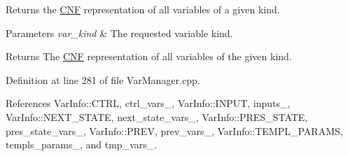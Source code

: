 Returns the \hyperlink{classCNF}{C\-N\-F} representation of all variables of a given kind. 


\begin{DoxyParams}{Parameters}
{\em var\-\_\-kind} & The requested variable kind. \\
\hline
\end{DoxyParams}
\begin{DoxyReturn}{Returns}
The \hyperlink{classCNF}{C\-N\-F} representation of all variables of the given kind. 
\end{DoxyReturn}


Definition at line 281 of file Var\-Manager.\-cpp.



References Var\-Info\-::\-C\-T\-R\-L, ctrl\-\_\-vars\-\_\-, Var\-Info\-::\-I\-N\-P\-U\-T, inputs\-\_\-, Var\-Info\-::\-N\-E\-X\-T\-\_\-\-S\-T\-A\-T\-E, next\-\_\-state\-\_\-vars\-\_\-, Var\-Info\-::\-P\-R\-E\-S\-\_\-\-S\-T\-A\-T\-E, pres\-\_\-state\-\_\-vars\-\_\-, Var\-Info\-::\-P\-R\-E\-V, prev\-\_\-vars\-\_\-, Var\-Info\-::\-T\-E\-M\-P\-L\-\_\-\-P\-A\-R\-A\-M\-S, templs\-\_\-params\-\_\-, and tmp\-\_\-vars\-\_\-.



